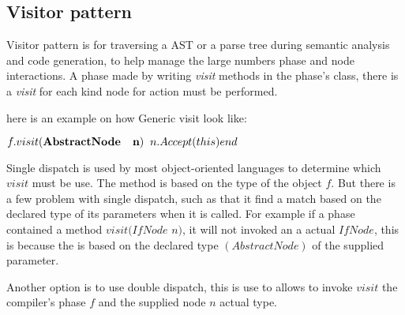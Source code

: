 \subsection{Visitor pattern}
\label{sec:VisitorPattern}
Visitor pattern is for traversing a AST or a parse tree during semantic analysis and code generation, to help manage the large numbers phase and node interactions. A phase made by writing \textit{visit} methods in the phase's class, there is a \textit{visit} for each kind node for action must be performed.

here is an example on how Generic visit look like:

$f.visit(\textbf{AbstractNode \; n})
\;\; n.Accept(this)
end$

Single dispatch is used by most object-oriented languages to determine which $visit$ must be use. The method is based on the type of the object $f$. But there is a few problem with single dispatch, such as that it find a match based on the declared type of its parameters when it is called. For example if a phase contained a method $visit(IfNode$ $n)$, it will not invoked an a actual $IfNode$, this is because the is based on the declared type $(AbstractNode)$ of the supplied parameter.

Another option is to use double dispatch, this is use to allows to invoke $visit$ the compiler's phase $f$ and the supplied node $n$ actual type.